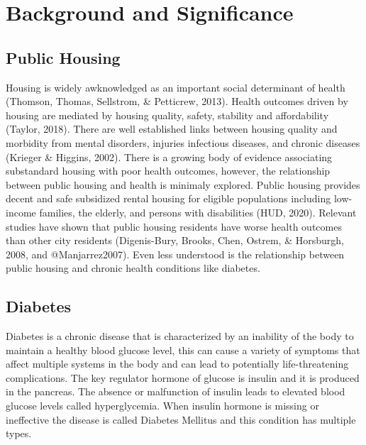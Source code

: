 \documentclass [11pt, proquest] {uwthesis}[2015/03/03]
\begin{document}
\titlepage
  \pagebreak


\copyrightpage

\setcounter{page}{-1}

\tableofcontents
\listoffigures
\listoftables



\textpages


\chapter{Background and Significance}\label{rmd-basics}

\section{Public Housing}\label{public-housing}

Housing is widely awknowledged as an important social determinant of
health (Thomson, Thomas, Sellstrom, \& Petticrew, 2013). Health outcomes
driven by housing are mediated by housing quality, safety, stability and
affordability (Taylor, 2018). There are well established links between
housing quality and morbidity from mental disorders, injuries infectious
diseases, and chronic diseases (Krieger \& Higgins, 2002). There is a
growing body of evidence associating substandard housing with poor
health outcomes, however, the relationship between public housing and
health is minimaly explored. Public housing provides decent and safe
subsidized rental housing for eligible populations including low-income
families, the elderly, and persons with disabilities (HUD, 2020).
Relevant studies have shown that public housing residents have worse
health outcomes than other city residents (Digenis-Bury, Brooks, Chen,
Ostrem, \& Horsburgh, 2008, and @Manjarrez2007). Even less understood is
the relationship between public housing and chronic health conditions
like diabetes.

\section{Diabetes}\label{diabetes}

Diabetes is a chronic disease that is characterized by an inability of
the body to maintain a healthy blood glucose level, this can cause a
variety of symptoms that affect multiple systems in the body and can
lead to potentially life-threatening complications. The key regulator
hormone of glucose is insulin and it is produced in the pancreas. The
absence or malfunction of insulin leads to elevated blood glucose levels
called hyperglycemia. When insulin hormone is missing or ineffective the
disease is called Diabetes Mellitus and this condition has multiple
types.
\end{document}
